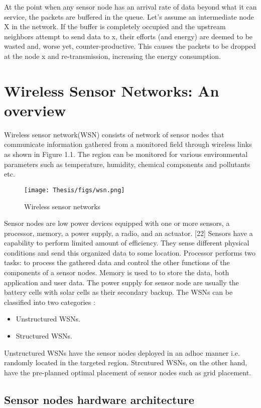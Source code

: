 \par 
At the point when any sensor node has an arrival rate of data beyond what it can service, the packets are buffered in the queue. Let's assume an intermediate node X in the network. If the buffer is completely occupied and the upstream neighbors attempt to send data to x, their efforts (and energy) are deemed to be wasted and, worse yet, counter-productive. This causes the packets to be dropped at the node x and re-transmission, increasing the energy consumption. 


\section{Wireless Sensor Networks: An overview}
Wireless sensor network(WSN) consists of network of sensor nodes that communicate information gathered from a monitored field through wireless links as shown in Figure 1.1. The region can be monitored for various environmental parameters such as temperature, humidity, chemical components and pollutants etc. 
\begin{figure}[h!]
    \centering
    \texttt{[image: Thesis/figs/wsn.png]}
    \caption{Wireless sensor networks}
    \label{fig:my_label}
\end{figure}
\par
Sensor nodes are low power devices equipped with one or more sensors, a processor, memory, a power supply, a radio, and an actuator. [22] Sensors have a capability to perform limited amount of efficiency. They sense different physical conditions and send this organized data to some location. Processor performs two tasks: to process the gathered data and control the other functions of the components of a sensor nodes. Memory is used to to store the data, both application and user data. The power supply for sensor node are usually the battery cells with solar cells as their secondary backup. 
The WSNs can be classified into two categories : 
\begin{itemize}
    \item Unstructured WSNs.
    \item Structured WSNs.
\end{itemize}
Unstructured WSNs have the sensor nodes deployed in an adhoc manner i.e. randomly located in the targeted region. Strcutured WSNs, on the other hand, have the pre-planned optimal placement of sensor nodes such as grid placement.
\par \subsection{Sensor nodes hardware architecture}

